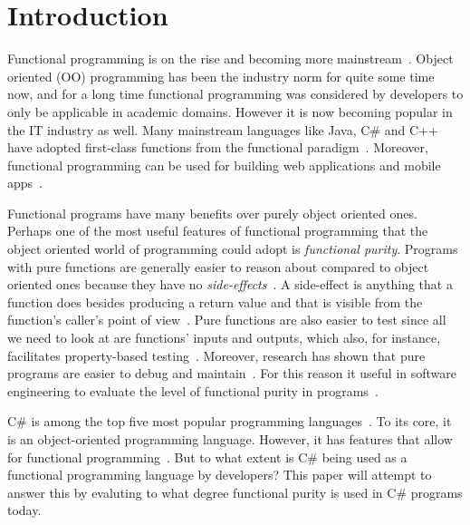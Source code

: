 \documentclass[a4paper,12pt]{article}
\begin{document}
\tableofcontents


\cleardoublepage

\mainmatter

\section{Introduction} \label{sec:Introduction}

Functional programming is on the rise and becoming more mainstream~\cite{intertech}. Object oriented (OO) programming has been the industry norm for quite some time now, and for a long time functional programming was considered by developers to only be applicable in academic domains. However it is now becoming popular in the IT industry as well. Many mainstream languages like Java, C\# and C++ have adopted first-class functions from the functional paradigm~\cite{intertech}. Moreover, functional programming can be used for building web applications and mobile apps~\cite{jonas-walter}.

Functional programs have many benefits over purely object oriented ones. Perhaps one of the most useful features of functional programming that the object oriented world of programming could adopt is \textit{functional purity}. Programs with pure functions are generally easier to reason about compared to object oriented ones because they have no \textit{side-effects}~\cite{alvin-alexander}. A side-effect is anything that a function does besides producing a return value and that is visible from the function's caller's point of view~\cite{purity-in-javascript}. Pure functions are also easier to test since all we need to look at are functions' inputs and outputs, which also, for instance, facilitates property-based testing~\cite{alvin-alexander}. Moreover, research has shown that pure programs are easier to debug and maintain~\cite{purity-in-javascript}. %
For this reason it useful in software engineering to evaluate the level of functional purity in programs~\cite{purity-in-javascript}.

C\# is among the top five most popular programming languages~\cite{tiobe}. To its core, it is an object-oriented programming language. However, it has features that allow for functional programming~\cite{hamid-mosalla}. But to what extent is C\# being used as a functional programming language by developers? This paper will attempt to answer this by evaluting to what degree functional purity is used in C\# programs today.
\end{document}
